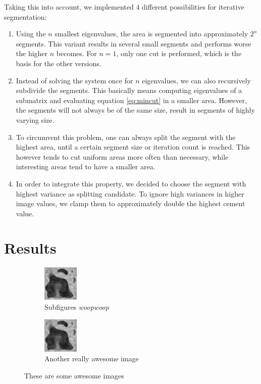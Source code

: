 \documentclass{article}
\begin{document}
  Taking this into account, we implemented 4 different possibilities for iterative segmentation:
  \begin{enumerate}
    \item
    Using the $n$ smallest eigenvalues, the area is segmented into approximately $2^n$ segments.
    This variant results in several small segments and performs worse the higher $n$ becomes.
    For $n = 1$, only one cut is performed, which is the basis for the other versions.
    \item
    Instead of solving the system once for $n$ eigenvalues, we can also recursively subdivide the segments.
    This basically means computing eigenvalues of a submatrix and evaluating equation \ref{eq:mincut} in a smaller area.
    However, the segments will not always be of the same size, result in segments of highly varying size.
    \item
    To circumvent this problem, one can always split the segment with the highest area, until a certain segment size or iteration count is reached.
    This however tends to cut uniform areas more often than necessary, while interesting areas tend to have a smaller area.
    \item
    In order to integrate this property, we decided to choose the segment with highest variance as splitting candidate.
    To ignore high variances in higher image values, we clamp them to approximately double the highest cement value.
  \end{enumerate}
  
  \section{Results}
  {
  \begin{figure}[h]
          \centering
    \begin{subfigure}[t]{0.45\linewidth}
      \centering
      \includegraphics{test.png}
      \caption{Subfigures \textit{woopwoop}}
    \end{subfigure}
    \hfill
    \begin{subfigure}[t]{0.45\linewidth}
      \centering
      \includegraphics{test.png}
      \caption{Another really awesome image}
    \end{subfigure}
    \caption{These are some awesome images}
  \end{figure}
  }
  \pagebreak
\end{document}
